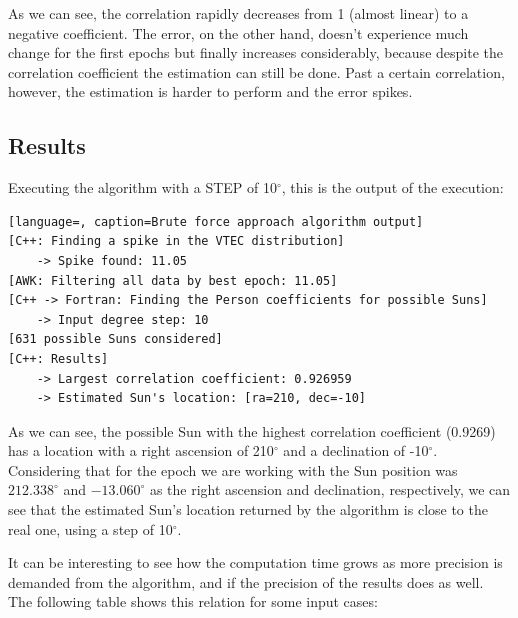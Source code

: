 As we can see, the correlation rapidly decreases from 1 (almost linear) to a negative coefficient. The error, on the other hand, doesn't experience much change for the first epochs but finally increases considerably, because despite the correlation coefficient the estimation can still be done. Past a certain correlation, however, the estimation is harder to perform and the error spikes. 

\subsection{Results}

Executing the algorithm with a STEP of 10$^{\circ}$, this is the output of the execution:

\begin{minipage}{\linewidth}
\begin{lstlisting}[language=, caption=Brute force approach algorithm output]
[C++: Finding a spike in the VTEC distribution]
	-> Spike found: 11.05
[AWK: Filtering all data by best epoch: 11.05]
[C++ -> Fortran: Finding the Person coefficients for possible Suns]
	-> Input degree step: 10
[631 possible Suns considered]
[C++: Results]
	-> Largest correlation coefficient: 0.926959
	-> Estimated Sun's location: [ra=210, dec=-10]
\end{lstlisting}
\end{minipage}

As we can see, the possible Sun with the highest correlation coefficient (0.9269) has a location with a right ascension of 210$^{\circ}$ and a declination of -10$^{\circ}$. Considering that for the epoch we are working with the Sun position was $212.338^{\circ}$ and $-13.060^{\circ}$ as the right ascension and declination, respectively, we can see that the estimated Sun's location returned by the algorithm is close to the real one, using a step of 10$^{\circ}$.

It can be interesting to see how the computation time grows as more precision is demanded from the algorithm, and if the precision of the results does as well. The following table shows this relation for some input cases:


